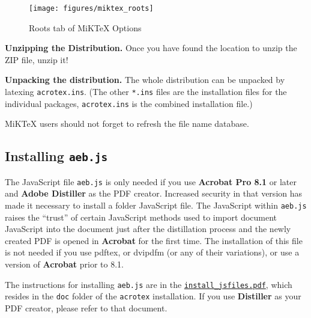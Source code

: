 \documentclass{article}
\def\latex/{{\protect\LaTeX}}
\def\tex/{{\protect\TeX}}
\begin{document}
\begin{questions}
\begin{figure}[hbt]\centering
\texttt{[image: figures/miktex\_roots]}
\caption{Roots tab of MiK{\TeX} Options}\label{fig:rootstab}
\end{figure}

\item \textbf{Unzipping the Distribution.} Once you have found the
location to unzip the ZIP file, unzip it!



\item \textbf{Unpacking the distribution.} The whole distribution can be
unpacked by latexing \texttt{acrotex.ins}. (The other \texttt{*.ins} files
are the installation files for the individual packages,
\texttt{acrotex.ins} is the combined installation file.)

\item[] {MiK\TeX} users should not forget to refresh the file name database.


\end{questions}



\subsection{Installing \texttt{aeb.js}}


The JavaScript file \texttt{aeb.js} is only needed if you use \textbf{Acrobat
Pro 8.1} or later and \textbf{Adobe Distiller} as the PDF creator. Increased
security in that version has made it necessary to install a folder JavaScript
file. The JavaScript within \texttt{aeb.js} raises the ``trust'' of certain
JavaScript methods used to import document JavaScript into the document just
after the distillation process and the newly created PDF is opened in
\textbf{Acrobat} for the first time. The installation of this file is not
needed if you use \textsf{pdftex}, or \textsf{dvipdfm} (or any of their
variations), or use a version of \textbf{Acrobat} prior to 8.1.

The instructions for installing \texttt{aeb.js} are in the
\texttt{\href{install_jsfiles.pdf}{install\_jsfiles.pdf}}, which resides in
the \texttt{doc} folder of the \texttt{acrotex} installation. If you use
\textbf{Distiller} as your PDF creator, please refer to that document.
\end{document}
